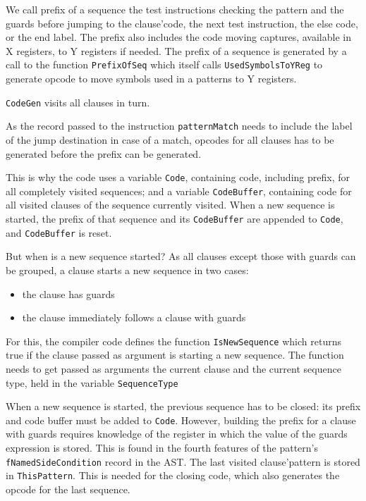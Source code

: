 \documentclass[a4paper]{memoir}
\begin{document}
We call prefix of a sequence the test
instructions checking the pattern and the guards before jumping to the
clause'code, the next test instruction, the else code, or the end label.
The prefix also includes the code moving captures, available in X registers,
to Y registers if needed.
The prefix of a sequence is generated by a call to the function
\lstinline!PrefixOfSeq! which itself calls \lstinline!UsedSymbolsToYReg! to
generate opcode to move symbols used in a patterns to Y registers.

\lstinline!CodeGen! visits all clauses in turn.

As the record passed to the instruction \lstinline!patternMatch! needs to
include the label of the jump destination in case of a match, opcodes for all
clauses has to be generated before the prefix can be generated.

This is why the code uses a variable \lstinline!Code!, containing code,
including prefix, for all completely visited sequences; and a variable
\lstinline!CodeBuffer!, containing code for all visited clauses of the sequence
currently visited. When a new sequence is started, the prefix of that sequence
and its \lstinline!CodeBuffer! are appended to \lstinline!Code!, and
\lstinline!CodeBuffer! is reset.

But when is a new sequence started? As all clauses except those with guards can
be grouped, a clause starts a new sequence in two cases:
\begin{itemize}
  \item the clause has guards
  \item the clause immediately follows a clause with guards
\end{itemize}

For this, the compiler code defines the function
\lstinline!IsNewSequence! which returns true if the clause passed as argument
is starting a new sequence. The function needs to get passed as arguments the current clause and
the current sequence type, held in the variable \lstinline!SequenceType!

When a new sequence is started, the previous sequence has to be closed: its
prefix and code buffer must be added to \lstinline!Code!. However, building the
prefix for a clause with guards requires knowledge of the register in which the
value of the guards expression is stored. This is found in the fourth features
of the pattern's \lstinline!fNamedSideCondition! record in the AST.
The last visited clause'pattern is stored in \lstinline!ThisPattern!. This is
needed for the closing code, which also generates the opcode for the last sequence.
\end{document}
